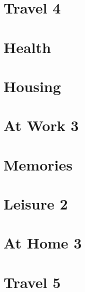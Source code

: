 \documentclass[a4paper,11pt,oneside]{book}
\begin{document}
\section{Travel 4}
\section{Health}
\section{Housing}
\section{At Work 3}
\section{Memories}
\section{Leisure 2}
\section{At Home 3}
\section{Travel 5}
\end{document}
